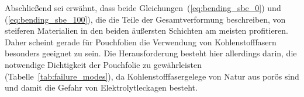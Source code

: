 Abschließend sei erwähnt, dass beide Gleichungen~(\ref{eq:bending_sbe_0}) und (\ref{eq:bending_sbe_100}), die die Teile der Gesamtverformung beschreiben, von steiferen Materialien in den beiden äußersten Schichten am meisten profitieren. Daher scheint gerade für Pouchfolien die Verwendung von Kohlenstofffasern besonders geeignet zu sein. Die Herausforderung besteht hier allerdings darin, die notwendige Dichtigkeit der Pouchfolie zu gewährleisten (Tabelle~\ref{tab:failure_modes}), da Kohlenstofffasergelege von Natur aus porös sind und damit die Gefahr von Elektrolytleckagen besteht.

